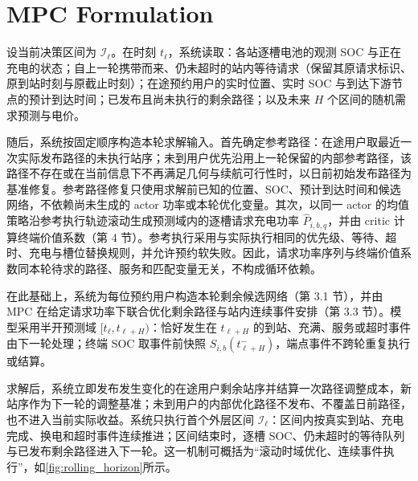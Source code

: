 \documentclass[12pt,a4paper,UTF8]{ctexart}
\begin{document}
\section{MPC Formulation}

设当前决策区间为 $\mathcal I_\ell$。在时刻 $t_\ell$，系统读取：各站逐槽电池的观测 SOC 与正在充电的状态；自上一轮携带而来、仍未超时的站内等待请求（保留其原请求标识、原到站时刻与原截止时刻）；在途预约用户的实时位置、实时 SOC 与到达下游节点的预计到达时间；已发布且尚未执行的剩余路径；以及未来 $H$ 个区间的随机需求预测与电价。

随后，系统按固定顺序构造本轮求解输入。首先确定参考路径：在途用户取最近一次实际发布路径的未执行站序；未到用户优先沿用上一轮保留的内部参考路径，该路径不存在或在当前信息下不再满足几何与续航可行性时，以日前初始发布路径为基准修复。参考路径修复只使用求解前已知的位置、SOC、预计到达时间和候选网络，不依赖尚未生成的 actor 功率或本轮优化变量。其次，以同一 actor 的均值策略沿参考执行轨迹滚动生成预测域内的逐槽请求充电功率 $\widehat P_{i,b,q}$，并由 critic 计算终端价值系数（第 4 节）。参考执行采用与实际执行相同的优先级、等待、超时、充电与槽位替换规则，并允许预约软失败。因此，请求功率序列与终端价值系数同本轮待求的路径、服务和匹配变量无关，不构成循环依赖。

在此基础上，系统为每位预约用户构造本轮剩余候选网络（第 3.1 节），并由 MPC 在给定请求功率下联合优化剩余路径与站内连续事件安排（第 3.3 节）。模型采用半开预测域 $[t_\ell,t_{\ell+H})$：恰好发生在 $t_{\ell+H}$ 的到站、充满、服务或超时事件由下一轮处理；终端 SOC 取事件前快照 $S_{i,b}(t_{\ell+H}^{-})$，端点事件不跨轮重复执行或结算。

求解后，系统立即发布发生变化的在途用户剩余站序并结算一次路径调整成本，新站序作为下一轮的调整基准；未到用户的内部优化路径不发布、不覆盖日前路径，也不进入当前实际收益。系统只执行首个外层区间 $\mathcal I_\ell$：区间内按真实到站、充电完成、换电和超时事件连续推进；区间结束时，逐槽 SOC、仍未超时的等待队列与已发布剩余路径进入下一轮。这一机制可概括为“滚动时域优化、连续事件执行”，如\autoref{fig:rolling_horizon}所示。
\end{document}
